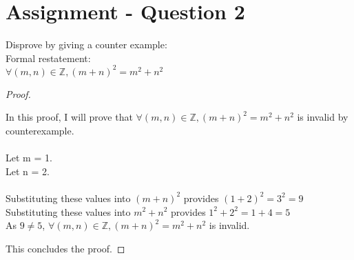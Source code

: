 \documentclass{article}
\newcommand{\baseLeft}{(m+n)^2}
\newcommand{\baseRight}{m^2+n^2}
\newcommand{\baseFormal}{\forall (m, n) \in \mathbb{Z}, \baseLeft=\baseRight}
\begin{document}
\section*{Assignment - Question 2}
Disprove by giving a counter example:\\
Formal restatement:\\
$\forall (m, n) \in \mathbb{Z}, \baseLeft=\baseRight $
\begin{proof}
  \begin{addmargin}{1em}
    In this proof, I will prove that $\baseFormal$ is invalid by counterexample.\\\\
    Let m = 1.\\
    Let n = 2.\\\\
    Substituting these values into $\baseLeft$ provides $(1+2)^2 = 3^2 = 9$\\
    Substituting these values into $\baseRight$ provides $1^2+2^2 = 1+4 = 5$ \\
    As $9 \neq 5$, $\baseFormal$ is invalid.\\
  \end{addmargin}
  This concludes the proof.
\end{proof}
\end{document}
